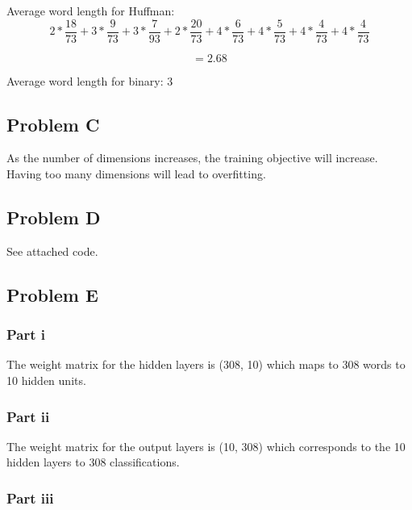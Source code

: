 \documentclass[12pt]{article} %
\begin{document}
Average word length for Huffman:
$$2 * \frac{18}{73} + 3 * \frac{9}{73} + 3 * \frac{7}{93} + 2 * \frac{20}{73} + 4 * \frac{6}{73} + 4 * \frac{5}{73} + 4 * \frac{4}{73} + 4 * \frac{4}{73}$$

$$ = 2.68 $$

Average word length for binary: 3

\subsection{Problem C}
As the number of dimensions increases, the training objective will increase. Having too many dimensions will lead to overfitting.

\subsection{Problem D}
See attached code.

\subsection{Problem E}
\subsubsection{Part i}
The weight matrix for the hidden layers is (308, 10) which maps to 308 words to 10 hidden units.

\subsubsection{Part ii}
The weight matrix for the output layers is (10, 308) which corresponds to the 10 hidden layers to 308 classifications.

\subsubsection{Part iii}
\end{document}
